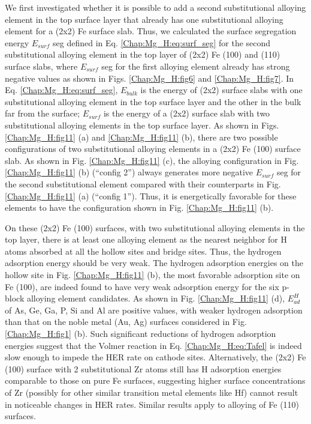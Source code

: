We first investigated whether it is possible to add a second substitutional alloying element in the top surface layer that already has one substitutional alloying element for a (2x2) Fe surface slab. Thus, we calculated the surface segregation energy $E_{surf}$ seg defined in Eq. \ref{Chap:Mg_H:eq:surf_seg} for the second substitutional alloying element in the top layer of (2x2) Fe (100) and (110) surface slabs, where $E_{surf}$ seg for the first alloying element already has strong negative values as shown in Figs. \ref{Chap:Mg_H:fig6} and \ref{Chap:Mg_H:fig7}. In Eq. \ref{Chap:Mg_H:eq:surf_seg}, $E_{bulk}$ is the energy of (2x2) surface slabs with one substitutional alloying element in the top surface layer and the other in the bulk far from the surface; $E_{surf}$ is the energy of a (2x2) surface slab with two substitutional alloying elements in the top surface layer. As shown in Figs. \ref{Chap:Mg_H:fig11} (a) and \ref{Chap:Mg_H:fig11} (b), there are two possible configurations of two substitutional alloying elements in a (2x2) Fe (100) surface slab. As shown in Fig. \ref{Chap:Mg_H:fig11} (c), the alloying configuration in Fig. \ref{Chap:Mg_H:fig11} (b) (“config 2”) always generates more negative $E_{surf}$ seg for the second substitutional element compared with their counterparts in Fig. \ref{Chap:Mg_H:fig11} (a) (“config 1”). Thus, it is energetically favorable for these elements to have the configuration shown in Fig. \ref{Chap:Mg_H:fig11} (b).


On these (2x2) Fe (100) surfaces, with two substitutional alloying elements in the top layer, there is at least one alloying element as the nearest neighbor for H atoms absorbed at all the hollow sites and bridge sites. Thus, the hydrogen adsorption energy should be very weak. The hydrogen adsorption energies on the hollow site in Fig. \ref{Chap:Mg_H:fig11} (b), the most favorable adsorption site on Fe (100), are indeed found to have very weak adsorption energy for the six p-block alloying element candidates. As shown in Fig. \ref{Chap:Mg_H:fig11} (d), $E_{ad}^H$ of As, Ge, Ga, P, Si and Al are positive values, with weaker hydrogen adsorption than that on the noble metal (Au, Ag) surfaces considered in Fig. \ref{Chap:Mg_H:fig1} (b). Such significant reductions of hydrogen adsorption energies suggest that the Volmer reaction in Eq. \ref{Chap:Mg_H:eq:Tafel} is indeed slow enough to impede the \ac{HER} rate on cathode sites. Alternatively, the (2x2) Fe (100) surface with 2 substitutional Zr atoms still has H adsorption energies comparable to those on pure Fe surfaces, suggesting higher surface concentrations of Zr (possibly for other similar transition metal elements like Hf) cannot result in noticeable changes in \ac{HER} rates. Similar results apply to alloying of Fe (110) surfaces.


